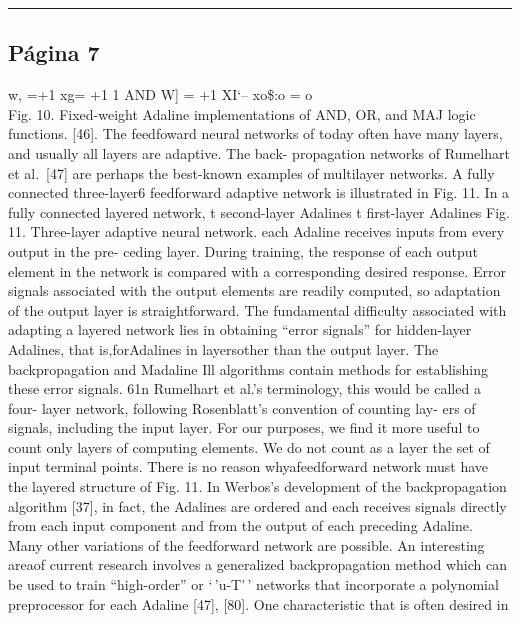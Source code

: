 \begin{center}\rule{0.5\linewidth}{0.5pt}\end{center}

\subsection{Página 7}\label{puxe1gina-7}

w, =+1 xg= +1 1 AND W{]} = +1 XI`-- xo\$:o = o\\
Fig. 10. Fixed-weight Adaline implementations of AND, OR, and MAJ logic
functions. {[}46{]}. The feedfoward neural networks of today often have
many layers, and usually all layers are adaptive. The back- propagation
networks of Rumelhart et al.~{[}47{]} are perhaps the best-known
examples of multilayer networks. A fully connected three-layer6
feedforward adaptive network is illustrated in Fig. 11. In a fully
connected layered network, t second-layer Adalines t first-layer
Adalines Fig. 11. Three-layer adaptive neural network. each Adaline
receives inputs from every output in the pre- ceding layer. During
training, the response of each output element in the network is compared
with a corresponding desired response. Error signals associated with the
output elements are readily computed, so adaptation of the output layer
is straightforward. The fundamental difficulty associated with adapting
a layered network lies in obtaining ``error signals'' for hidden-layer
Adalines, that is,forAdalines in layersother than the output layer. The
backpropagation and Madaline Ill algorithms contain methods for
establishing these error signals. 61n Rumelhart et al.'s terminology,
this would be called a four- layer network, following Rosenblatt's
convention of counting lay- ers of signals, including the input layer.
For our purposes, we find it more useful to count only layers of
computing elements. We do not count as a layer the set of input terminal
points. There is no reason whyafeedforward network must have the layered
structure of Fig. 11. In Werbos's development of the backpropagation
algorithm {[}37{]}, in fact, the Adalines are ordered and each receives
signals directly from each input component and from the output of each
preceding Adaline. Many other variations of the feedforward network are
possible. An interesting areaof current research involves a generalized
backpropagation method which can be used to train ``high-order'' or
`\,'u-T'\,' networks that incorporate a polynomial preprocessor for each
Adaline {[}47{]}, {[}80{]}. One characteristic that is often desired in
